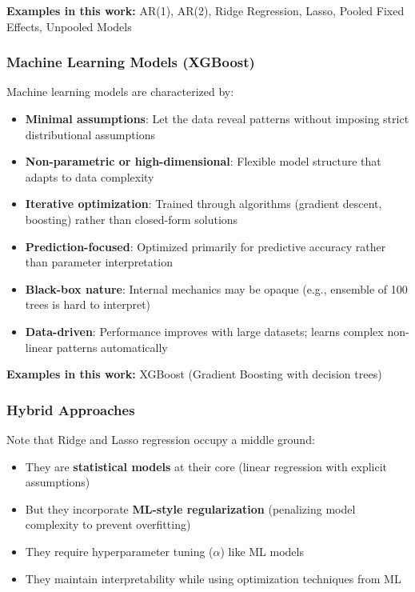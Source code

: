 \documentclass[12pt,a4paper]{article}
\begin{document}
\textbf{Examples in this work:} AR(1), AR(2), Ridge Regression, Lasso, Pooled Fixed Effects, Unpooled Models

\subsubsection{Machine Learning Models (XGBoost)}

Machine learning models are characterized by:
\begin{itemize}
    \item \textbf{Minimal assumptions}: Let the data reveal patterns without imposing strict distributional assumptions
    \item \textbf{Non-parametric or high-dimensional}: Flexible model structure that adapts to data complexity
    \item \textbf{Iterative optimization}: Trained through algorithms (gradient descent, boosting) rather than closed-form solutions
    \item \textbf{Prediction-focused}: Optimized primarily for predictive accuracy rather than parameter interpretation
    \item \textbf{Black-box nature}: Internal mechanics may be opaque (e.g., ensemble of 100 trees is hard to interpret)
    \item \textbf{Data-driven}: Performance improves with large datasets; learns complex non-linear patterns automatically
\end{itemize}

\textbf{Examples in this work:} XGBoost (Gradient Boosting with decision trees)

\subsubsection{Hybrid Approaches}

Note that Ridge and Lasso regression occupy a middle ground:
\begin{itemize}
    \item They are \textbf{statistical models} at their core (linear regression with explicit assumptions)
    \item But they incorporate \textbf{ML-style regularization} (penalizing model complexity to prevent overfitting)
    \item They require hyperparameter tuning ($\alpha$) like ML models
    \item They maintain interpretability while using optimization techniques from ML
\end{itemize}
\end{document}

